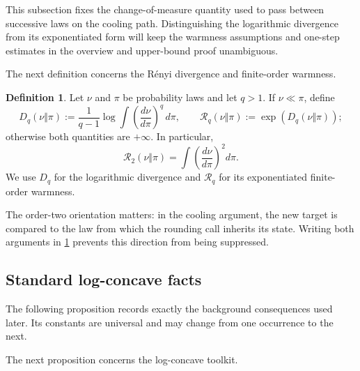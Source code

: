 \documentclass[11pt]{article}
\numberwithin{equation}{section}
\theoremstyle{definition}
\newtheorem{definition}[definition]{Definition}
\begin{document}
This subsection fixes the change-of-measure quantity used to pass between
successive laws on the cooling path.
Distinguishing the logarithmic divergence from its exponentiated form will keep
the warmness assumptions and one-step estimates in the overview and upper-bound
proof unambiguous.

The next definition concerns the R\'enyi divergence and finite-order warmness.

\begin{definition}
\label{def:renyi-divergence}
Let $\nu$ and
$\pi$ be probability laws and let
$q>1$.
If $\nu\ll\pi$, define
\[
D_q(\nu\Vert\pi) :=\frac{1}{q-1}\log \int\left(\frac{d\nu}{d\pi}\right)^q\,d\pi,
\qquad
\mathcal R_q(\nu\Vert\pi):=\exp(D_q(\nu\Vert\pi));
\]
otherwise both quantities are $+\infty$.
In particular,
\[
 \mathcal R_2(\nu\Vert\pi)
 =\int\left(\frac{d\nu}{d\pi}\right)^2d\pi.
\]
We use $D_q$ for the logarithmic divergence and
$\mathcal R_q$ for its exponentiated finite-order warmness.
\end{definition}

The order-two orientation matters: in the cooling argument, the new target is
compared to the law from which the rounding call inherits its state.
Writing both arguments in \cref{def:renyi-divergence} prevents this direction
from being suppressed.

\subsection{Standard log-concave facts}
\label{sec:prelim-log-concave}

The following proposition records exactly the background consequences used
later.
Its constants are universal and may change from one occurrence to the next.

The next proposition concerns the log-concave toolkit.
\end{document}

